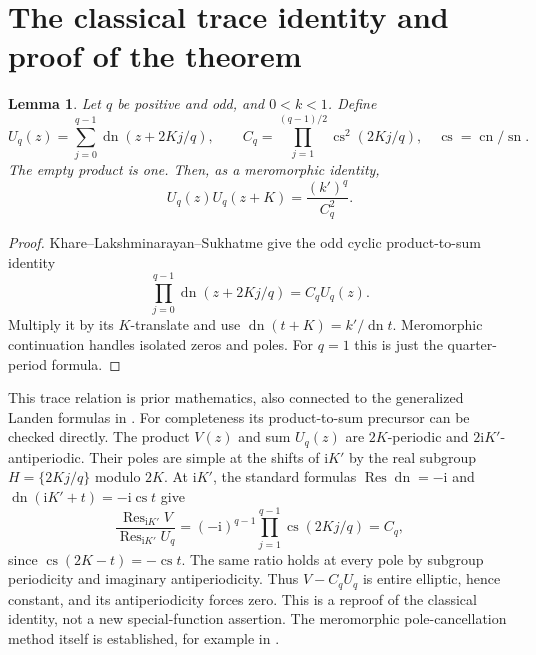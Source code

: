 \documentclass[11pt]{article}
\newtheorem{lemma}[theorem]{Lemma}
\newcommand{\sn}{\operatorname{sn}}
\newcommand{\cn}{\operatorname{cn}}
\newcommand{\dn}{\operatorname{dn}}
\newcommand{\cs}{\operatorname{cs}}
\newcommand{\ii}{\mathrm i}
\begin{document}
\section{The classical trace identity and proof of the theorem}
\begin{lemma}\label{lem:trace}
Let $q$ be positive and odd, and $0<k<1$. Define
\[
 U_q(z)=\sum_{j=0}^{q-1}\dn(z+2Kj/q),\qquad
 C_q=\prod_{j=1}^{(q-1)/2}\cs^2(2Kj/q),\quad \cs=\cn/\sn.
\]
The empty product is one. Then, as a meromorphic identity,
\begin{equation}\label{eq:trace}
 U_q(z)U_q(z+K)=\frac{(k')^q}{C_q^2}.
\end{equation}
\end{lemma}
\begin{proof}
Khare--Lakshminarayan--Sukhatme
\cite[Appendix A, equation (86) in arXiv v1; (85) in v2]{KLS}
give the odd cyclic product-to-sum identity
\[
 \prod_{j=0}^{q-1}\dn(z+2Kj/q)=C_q U_q(z).
\]
Multiply it by its $K$-translate and use
$\dn(t+K)=k'/\dn t$. Meromorphic continuation handles isolated zeros
and poles. For $q=1$ this is just the quarter-period formula.
\end{proof}
This trace relation is prior mathematics, also connected to the generalized
Landen formulas in \cite{KS}. For completeness its product-to-sum precursor
can be checked directly. The product $V(z)$ and sum $U_q(z)$ are
$2K$-periodic and $2\ii K'$-antiperiodic. Their poles are simple at the
shifts of $\ii K'$ by the real subgroup $H=\{2Kj/q\}$ modulo $2K$.
At $\ii K'$, the standard formulas
$\operatorname{Res}\dn=-\ii$ and
$\dn(\ii K'+t)=-\ii\cs t$ give
\[
 \frac{\operatorname{Res}_{\ii K'}V}{\operatorname{Res}_{\ii K'}U_q}
 =(-\ii)^{q-1}\prod_{j=1}^{q-1}\cs(2Kj/q)=C_q,
\]
since $\cs(2K-t)=-\cs t$. The same ratio holds at every pole by subgroup
periodicity and imaginary antiperiodicity. Thus $V-C_qU_q$ is entire
elliptic, hence constant, and its antiperiodicity forces zero. This is a
reproof of the classical identity, not a new special-function assertion.
The meromorphic pole-cancellation method itself is established, for example
in \cite{KLS,AST,CC}.
\end{document}
